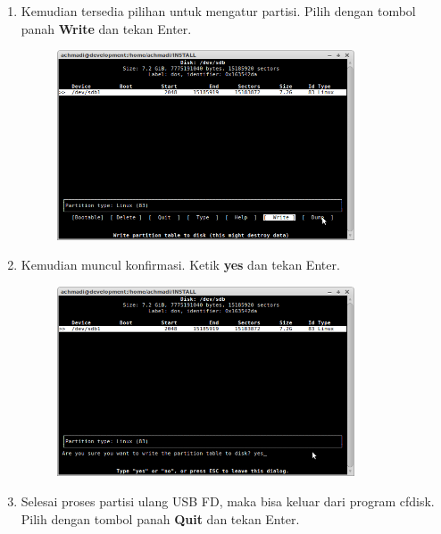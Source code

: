 \documentclass[12pt,]{article}
\begin{document}
\begin{enumerate}
		\item Kemudian tersedia pilihan untuk mengatur partisi.
		Pilih dengan tombol panah \textbf{Write} dan tekan Enter.
		
		\newpage
		\begin{figure}[!ht]
			\centering
			\includegraphics[width=250pt]{usbubuntu/step_8}
		\end{figure}
	
		\item Kemudian muncul konfirmasi. Ketik \textbf{yes} dan tekan Enter.
		
		\begin{figure}[!ht]
			\centering
			\includegraphics[width=250pt]{usbubuntu/step_9}
		\end{figure}
	
		\item Selesai proses partisi ulang USB FD, maka bisa keluar dari program cfdisk. 
		Pilih dengan tombol panah \textbf{Quit} dan tekan Enter.
		

\end{enumerate}
\end{document}
